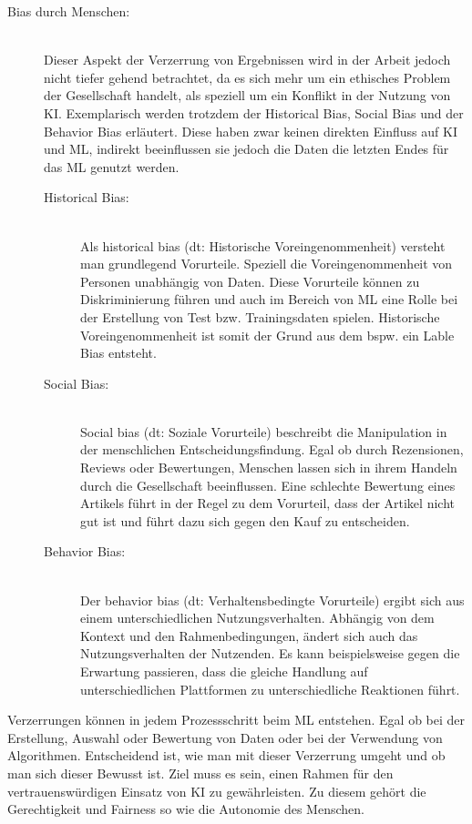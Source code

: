 \begin{onehalfspace}
\begin{description}
            \item [Bias durch Menschen:] \hfill \\
            Dieser Aspekt der Verzerrung von Ergebnissen wird in der Arbeit jedoch nicht tiefer gehend betrachtet, da es sich mehr um ein ethisches Problem der Gesellschaft handelt, als speziell um ein Konflikt in der Nutzung von \ac{KI}. Exemplarisch werden trotzdem der Historical Bias, Social Bias und der Behavior Bias erläutert. Diese haben zwar keinen direkten Einfluss auf \ac*{KI} und \ac*{ML}, indirekt beeinflussen sie jedoch die Daten die letzten Endes für das \ac*{ML} genutzt werden.
            \begin{description}
                \item [Historical Bias:] \hfill \\
                Als \glqq{}historical bias\grqq{} (\ac*{dt}: Historische Voreingenommenheit) versteht man grundlegend Vorurteile. Speziell die Voreingenommenheit von Personen unabhängig von Daten. Diese Vorurteile können zu Diskriminierung führen und auch im Bereich von \ac*{ML} eine Rolle bei der Erstellung von Test bzw. Trainingsdaten spielen. Historische Voreingenommenheit ist somit der Grund aus dem bspw. ein Lable Bias entsteht.\cite{Mehrabi2021}\cite{Parkavi2018}
                \item [Social Bias:] \hfill \\
                \glqq{}Social bias\grqq{} (\ac*{dt}: Soziale Vorurteile) beschreibt die Manipulation in der menschlichen Entscheidungsfindung. Egal ob durch Rezensionen, Reviews oder Bewertungen, Menschen lassen sich in ihrem Handeln durch die Gesellschaft beeinflussen. Eine schlechte Bewertung eines Artikels führt in der Regel zu dem Vorurteil, dass der Artikel nicht gut ist und führt dazu sich gegen den Kauf zu entscheiden.\cite{Mehrabi2021}\cite{Parkavi2018}
                \item [Behavior Bias:] \hfill \\
                Der \glqq{}behavior bias\grqq{} (\ac*{dt}: Verhaltensbedingte Vorurteile) ergibt sich aus einem unterschiedlichen Nutzungsverhalten. Abhängig von dem Kontext und den Rahmenbedingungen, ändert sich auch das Nutzungsverhalten der Nutzenden. Es kann beispielsweise gegen die Erwartung passieren, dass die gleiche Handlung auf unterschiedlichen Plattformen zu unterschiedliche Reaktionen führt.\cite{Mehrabi2021}
            \end{description}
        \end{description}
        Verzerrungen können in jedem Prozessschritt beim \ac*{ML} entstehen. Egal ob bei der Erstellung, Auswahl oder Bewertung von Daten oder bei der Verwendung von Algorithmen. Entscheidend ist, wie man mit dieser Verzerrung umgeht und ob man sich dieser Bewusst ist. Ziel muss es sein, einen Rahmen für den vertrauenswürdigen Einsatz von \ac*{KI} zu gewährleisten. Zu diesem gehört die Gerechtigkeit und Fairness so wie die Autonomie des Menschen. 

\end{onehalfspace}
